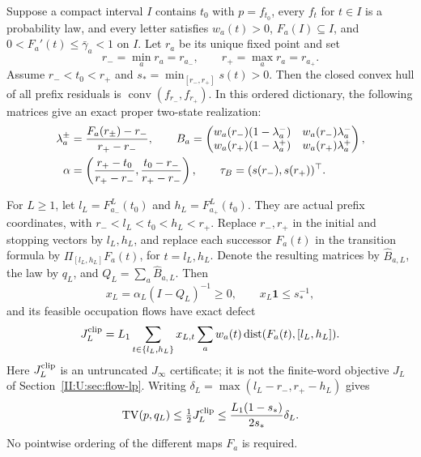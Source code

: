 \begin{theorem}
\label{II:U:thm:rank-two-monotone}
Suppose a compact interval $I$ contains $t_0$ with $p=f_{t_0}$,
every $f_t$ for $t\in I$ is a probability law, and every letter satisfies
$w_a(t)>0$, $F_a(I)\subseteq I$, and
$0<F_a'(t)\le\bar\gamma_a<1$ on $I$.
Let $r_a$ be its unique fixed point and set
\[
 r_-=\min_a r_a=r_{a_-},\qquad
 r_+=\max_a r_a=r_{a_+}.
\]
Assume $r_-<t_0<r_+$ and
$s_*=\min_{[r_-,r_+]}s(t)>0$.
Then the closed convex hull of all prefix residuals is
$\operatorname{conv}(f_{r_-},f_{r_+})$. In this ordered dictionary,
the following matrices give an exact proper two-state realization:
\begin{align}
 \lambda_a^\pm&=\frac{F_a(r_\pm)-r_-}{r_+-r_-},\qquad
 B_a=\begin{pmatrix}
 w_a(r_-)(1-\lambda_a^-)&w_a(r_-)\lambda_a^-\\
 w_a(r_+)(1-\lambda_a^+)&w_a(r_+)\lambda_a^+
 \end{pmatrix},\notag\\
 \alpha&=\left(\frac{r_+-t_0}{r_+-r_-},
              \frac{t_0-r_-}{r_+-r_-}\right),\qquad
 \tau_B=(s(r_-),s(r_+))^\top.
 \label{II:U:eq:rank-two-limit-model}
\end{align}

For $L\ge1$, let
$l_L=F_{a_-}^L(t_0)$ and $h_L=F_{a_+}^L(t_0)$.
They are actual prefix coordinates, with
$r_-<l_L<t_0<h_L<r_+$.
Replace $r_-,r_+$ in the initial and stopping vectors by $l_L,h_L$,
and replace each successor $F_a(t)$ in the transition formula by
$\Pi_{[l_L,h_L]}F_a(t)$, for $t=l_L,h_L$. Denote the resulting
matrices by $\widehat B_{a,L}$, the law by $q_L$, and
$Q_L=\sum_a\widehat B_{a,L}$. Then
\[
 x_L=\alpha_L(I-Q_L)^{-1}\ge0,\qquad x_L\mathbf1\le s_*^{-1},
\]
and its feasible occupation flows have exact defect
\begin{equation}
 J_L^{\rm clip}
 =L_1\sum_{t\in\{l_L,h_L\}}x_{L,t}
        \sum_a w_a(t)\operatorname{dist}(F_a(t),[l_L,h_L]).
 \label{II:U:eq:rank-two-clip-defect}
\end{equation}
Here $J_L^{\rm clip}$ is an untruncated $J_\infty$ certificate;
it is not the finite-word objective $J_L$ of Section~\ref{II:U:sec:flow-lp}.
Writing $\delta_L=\max(l_L-r_-,r_+-h_L)$ gives
\begin{equation}
 \operatorname{TV}(p,q_L)\le\tfrac12J_L^{\rm clip}
 \le\frac{L_1(1-s_*)}{2s_*}\delta_L.
 \label{II:U:eq:rank-two-clip-tv}
\end{equation}
No pointwise ordering of the different maps $F_a$ is required.
\end{theorem}


